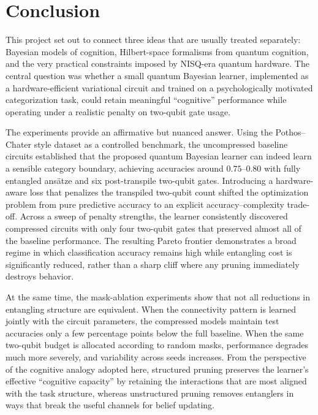 \documentclass[conference]{IEEEtran}
\begin{document}
\section{Conclusion}
\label{sec:conclusion}

This project set out to connect three ideas that are usually treated
separately: Bayesian models of cognition, Hilbert-space formalisms from quantum
cognition, and the very practical constraints imposed by NISQ-era quantum
hardware. The central question was whether a small quantum Bayesian learner,
implemented as a hardware-efficient variational circuit and trained on a
psychologically motivated categorization task, could retain meaningful
``cognitive'' performance while operating under a realistic penalty on
two-qubit gate usage.

The experiments provide an affirmative but nuanced answer. Using the
Pothos--Chater style dataset as a controlled benchmark, the uncompressed
baseline circuits established that the proposed quantum Bayesian learner can
indeed learn a sensible category boundary, achieving accuracies around
$0.75$--$0.80$ with fully entangled ansätze and six post-transpile two-qubit
gates. Introducing a hardware-aware loss that penalizes the transpiled
two-qubit count shifted the optimization problem from pure predictive accuracy
to an explicit accuracy--complexity trade-off. Across a sweep of penalty
strengths, the learner consistently discovered compressed circuits with only
four two-qubit gates that preserved almost all of the baseline performance.
The resulting Pareto frontier demonstrates a broad regime in which
classification accuracy remains high while entangling cost is significantly
reduced, rather than a sharp cliff where any pruning immediately destroys
behavior.

At the same time, the mask-ablation experiments show that not all
reductions in entangling structure are equivalent. When the connectivity
pattern is learned jointly with the circuit parameters, the compressed models
maintain test accuracies only a few percentage points below the full baseline.
When the same two-qubit budget is allocated according to random masks,
performance degrades much more severely, and variability across seeds
increases. From the perspective of the cognitive analogy adopted here,
structured pruning preserves the learner’s effective ``cognitive capacity''
by retaining the interactions that are most aligned with the task structure,
whereas unstructured pruning removes entanglers in ways that break the
useful channels for belief updating.
\end{document}
